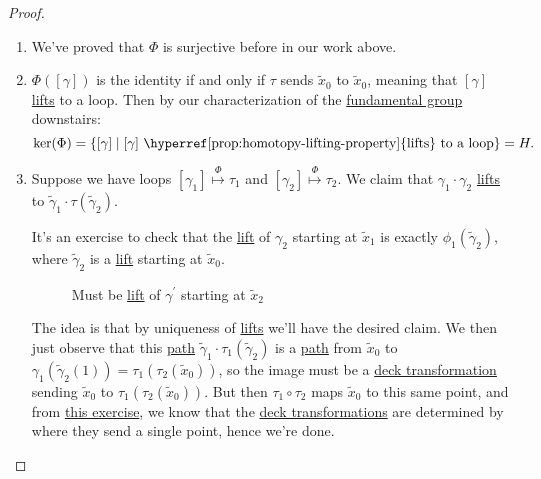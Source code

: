 \begin{proof}
	\begin{enumerate}
		\item We've proved that \(\Phi \) is surjective before in our work above.
		\item \(\Phi ([\gamma ])\) is the identity if and only if \(\tau \) sends \(\widetilde{x} _0\) to \(\widetilde{x} _0\), meaning that \([\gamma ]\)
		      \hyperref[prop:homotopy-lifting-property]{lifts} to a loop. Then by our characterization of the \hyperref[def:fundamental-group]{fundamental group} downstairs:
		      \[
			      \ker (\Phi ) = \left\{[\gamma ] \mid \text{\([\gamma ]\) \hyperref[prop:homotopy-lifting-property]{lifts} to a loop} \right\} = H.
		      \]
		\item Suppose we have loops \([\gamma _1]\overset{\Phi }{\mapsto } \tau _1\) and \([\gamma _2]\overset{\Phi }{\mapsto }\tau _2\). We claim that \(\gamma _1\cdot \gamma _2\)
		      \hyperref[prop:homotopy-lifting-property]{lifts} to \(\widetilde{\gamma} _1\cdot \tau (\widetilde{\gamma} _2)\).
		      \begin{figure}[H]
			      \centering
			      \label{fig:pf:prop:lec17-1}
		      \end{figure}
		      It's an exercise to check that the \hyperref[prop:homotopy-lifting-property]{lift} of \(\gamma _2\) starting at \(\widetilde{x} _1\) is exactly
		      \(\phi _1(\widetilde{\gamma} _2)\), where \(\widetilde{\gamma} _2\) is a \hyperref[prop:homotopy-lifting-property]{lift} starting at \(\widetilde{x} _0\).
		      \begin{figure}[H]
			      \centering
			      \caption{Must be \hyperref[prop:homotopy-lifting-property]{lift} of \(\gamma ^\prime \) starting at \(\widetilde{x} _2\)}
			      \label{fig:pf:prop:lec17-2}
		      \end{figure}
		      The idea is that by uniqueness of \hyperref[prop:homotopy-lifting-property]{lifts} we'll have the desired claim. We then just observe that
		      this \hyperref[def:path]{path} \(\widetilde{\gamma} _1\cdot \tau _1(\widetilde{\gamma} _2)\) is a \hyperref[def:path]{path} from \(\widetilde{x} _0\)
		      to \(\gamma_1(\widetilde{\gamma} _2(1)) = \tau_1(\tau _2(\widetilde{x} _0))\), so the image must be a \hyperref[def:deck-transformation]{deck transformation}
		      sending \(\widetilde{x} _0\) to \(\tau _1(\tau _2(\widetilde{x} _0))\). But then \(\tau _1\circ \tau _2\) maps \(\widetilde{x} _0\)
		      to this same point, and from \hyperref[ex:lec17]{this exercise}, we know that the \hyperref[def:deck-transformation]{deck transformations} are determined by
		      where they send a single point, hence we're done.
	\end{enumerate}
\end{proof}

